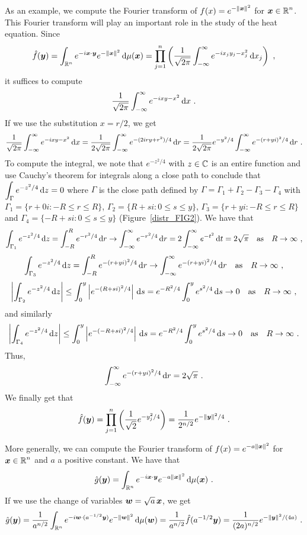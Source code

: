 \begin{egg}
As an example, we compute the Fourier transform of
$\displaystyle f(x) = e^{-\|{\bm{x}}\|^2}$ for $\displaystyle {\bm{x}} \in \mathbb{R}^n$.
This Fourier transform will play an important role in the study of the
heat equation.  \label{FTexpx2}
Since
\[
  \hat{f}(\VEC{y}) = \int_{\RR^n} e^{-i \VEC{x}\cdot\VEC{y}}
e^{-\|\VEC{x}\|^2} \dx{\mu(\VEC{x})} 
= \prod_{j=1}^n \left( \frac{1}{\sqrt{2\pi}}
  \int_{-\infty}^\infty  e^{-i x_j y_j - x_j^2} \dx{x_j} \right) \ ,
\]
it suffices to compute
\[
\frac{1}{\sqrt{2\pi}} \int_{-\infty}^\infty  e^{-i x y - x^2} \,\mathrm{d}{x} \ .
\]
If we use the substitution $x = r/2$, we get
\[
\frac{1}{\sqrt{2\pi}} \int_{-\infty}^\infty  e^{-i x y - x^2} \,\mathrm{d}{x}
= \frac{1}{2\sqrt{2\pi}} \int_{-\infty}^\infty  e^{-(2 i r y + r^2)/4} \,\mathrm{d}{r}
= \frac{1}{2\sqrt{2\pi}} e^{-y^2/4}
\int_{-\infty}^\infty  e^{-(r+ y i)^2/4} \,\mathrm{d}{r} \ .
\]
To compute the integral, we note that $\displaystyle e^{-z^2/4}$ with
$z \in \mathbb{C}$ is an entire function and use Cauchy's theorem for
integrals along a close path to conclude that
$\displaystyle \int_{\Gamma} e^{-z^2/4} \,\mathrm{d}{z} = 0$ where $\Gamma$ is
the close path defined by
$\displaystyle \Gamma = \Gamma_1 + \Gamma_2 - \Gamma_3 - \Gamma_4$
with $\Gamma_1 = \{r + 0 i : -R \leq r \leq R\}$,
$\Gamma_2=\{R + s i : 0 \leq s \leq y \}$,
$\Gamma_3 = \{r + y i : -R \leq r \leq R\}$ and
$\Gamma_4 = \{-R + s i : 0 \leq s \leq y\}$ (Figure~\ref{distr_FIG2}).
We have that
\[
\int_{\Gamma_1} e^{-z^2/4} \,\mathrm{d}{z}
= \int_{-R}^R e^{-r^2/4} \,\mathrm{d}{r} \to \int_{-\infty}^\infty e^{-r^2/4} \,\mathrm{d}{r}
= 2 \int_{-\infty}^\infty e^{-t^2} \,\mathrm{d}{t} = 2\sqrt{\pi}
\quad \text{as} \quad R \to \infty \ ,
\]
\[
\int_{\Gamma_3} e^{-z^2/4} \,\mathrm{d}{z}
= \int_{-R}^R e^{-(r+y i)^2/4} \,\mathrm{d}{r} \to
\int_{-\infty}^\infty e^{-(r+yi)^2/4} \,\mathrm{d}{r}
\quad \text{as} \quad R \to \infty \ ,
\]
\[
\left| \int_{\Gamma_2} e^{-z^2/4} \,\mathrm{d}{z} \right|
\leq \int_0^y \left| e^{-(R+s i)^2/4}\right| \,\mathrm{d}{s}
= e^{-R^2/4} \int_0^y e^{s^2/4} \,\mathrm{d}{s} \to 0
\quad \text{as} \quad R \to \infty \ ,
\]
and similarly
\[
\left| \int_{\Gamma_4} e^{-z^2/4} \,\mathrm{d}{z} \right|
\leq \int_0^y \left| e^{-(-R+s i)^2/4}\right| \,\mathrm{d}{s}
= e^{-R^2/4} \int_0^y e^{s^2/4} \,\mathrm{d}{s} \to 0
\quad \text{as} \quad R \to \infty \ .
\]
Thus,
\[
\int_{-\infty}^\infty  e^{-(r+ y i)^2/4} \,\mathrm{d}{r} = 2 \sqrt{\pi} \ .
\]
We finally get that
\[
\hat{f}({\bm{y}}) = 
\prod_{j=1}^n \left( \frac{1}{\sqrt{2}} e^{-y_j^2/4} \right)
= \frac{1}{2^{n/2}} e^{-\|{\bm{y}}\|^2/4} \ .
\]

More generally, we can compute the Fourier transform of
$\displaystyle f(x) = e^{-a \|{\bm{x}}\|^2}$ for
$\displaystyle {\bm{x}} \in \mathbb{R}^n$
and $a$ a positive constant.  We have that
\[
\hat{g}({\bm{y}}) = \int_{\mathbb{R}^n} e^{-i {\bm{x}}\cdot{\bm{y}}}
e^{-a\|{\bm{x}}\|^2} \,\mathrm{d}{\mu({\bm{x}})} \ .
\]
If we use the change of variables ${\bm{w}} = \sqrt{a}\, {\bm{x}}$, we get
\begin{equation} \label{FTexpx2eq1}
\hat{g}({\bm{y}}) = \frac{1}{a^{n/2}}
\int_{\mathbb{R}^n} e^{-i {\bm{w}}\cdot (a^{-1/2}{\bm{y}})}
e^{-\|{\bm{w}}\|^2} \,\mathrm{d}{\mu({\bm{w}})}
= \frac{1}{a^{n/2}} \hat{f}(a^{-1/2}{\bm{y}})
= \frac{1}{(2a)^{n/2}} e^{-\|{\bm{y}}\|^2/(4a)} \ .
\end{equation}
\end{egg}


